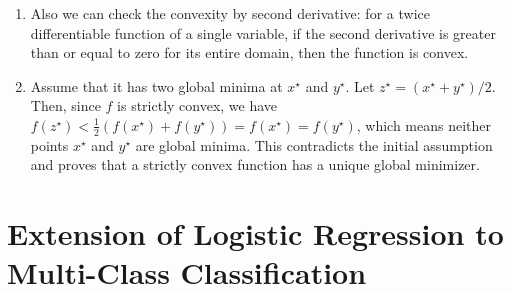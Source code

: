 \documentclass{../../tex_import/ETHuebung_english_theory}
\begin{document}
\begin{enumerate}
	\item Also we can check the convexity by second derivative: for a twice differentiable function of a single variable, if the second derivative is greater than or equal to zero for its entire domain, then the function is convex.

	\item Assume that it has two global minima at $x^\star$ and
	$y^\star$. Let $z^\star=(x^\star+y^\star)/2$. Then, since $f$ is strictly
	convex,
we have $f(z^\star) < \frac{1}{2}(f(x^\star)+f(y^\star))= f(x^\star)=f(y^\star)$, which
means neither points $x^\star$ and $y^\star$ are global minima. This contradicts the initial assumption and proves that a strictly convex function has a unique global minimizer.
\end{enumerate}




\newpage
\section{Extension of Logistic Regression to Multi-Class Classification}
\end{document}
